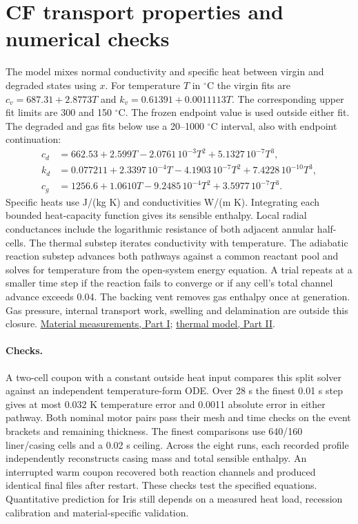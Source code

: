 \section{CF transport properties and numerical checks}
The model mixes normal conductivity and specific heat between virgin and
degraded states using $x$. For temperature $T$ in $^\circ$C the virgin
fits are $c_v=687.31+2.8773T$ and $k_v=0.61391+0.0011113T$.
The corresponding upper fit limits are 300 and 150 $^\circ$C. The frozen
endpoint value is used outside either fit. The degraded and gas fits below
use a 20--1000 $^\circ$C interval, also with endpoint continuation:
\begin{align*}
 c_d &=662.53+2.599T-2.0761\,10^{-3}T^2+5.1327\,10^{-7}T^3,\\
 k_d &=0.077211+2.3397\,10^{-4}T-4.1903\,10^{-7}T^2+7.4228\,10^{-10}T^3,\\
 c_g &=1256.6+1.0610T-9.2485\,10^{-4}T^2+3.5977\,10^{-7}T^3 .
\end{align*}
Specific heats use J/(kg K) and conductivities W/(m K). Integrating each
bounded heat-capacity function gives its sensible enthalpy. Local radial
conductances include the logarithmic resistance of both adjacent annular
half-cells. The thermal substep iterates conductivity with temperature.
The adiabatic reaction substep advances both pathways against a common
reactant pool and solves for temperature from the open-system energy
equation. A trial repeats at a smaller time step if the reaction fails to
converge or if any cell's total channel advance exceeds 0.04.
The backing vent removes gas enthalpy once at generation. Gas pressure,
internal transport work, swelling and delamination are outside this closure.
\href{https://doi.org/10.3390/ma10050494}{Material measurements, Part I};
\href{https://doi.org/10.3390/ma10050470}{thermal model, Part II}.

\paragraph{Checks.}
A two-cell coupon with a constant outside heat input compares this split solver
against an independent temperature-form ODE. Over 28 s the finest 0.01 s step
gives at most 0.032 K temperature error and 0.0011 absolute error in either
pathway. Both nominal motor pairs pass their mesh and time checks on the
event brackets and remaining thickness. The finest comparisons use 640/160
liner/casing cells and a 0.02 s ceiling. Across the eight runs, each recorded
profile independently reconstructs casing mass and total sensible enthalpy.
An interrupted warm coupon recovered both reaction channels and produced
identical final files after restart. These checks test the specified equations.
Quantitative prediction for Iris still depends on a measured heat load,
recession calibration and material-specific validation.
\clearpage

